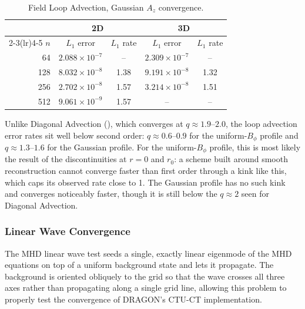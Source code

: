 \documentclass[11pt]{report}
\begin{document}
\begin{table}[htbp]
\centering
\caption{Field Loop Advection, Gaussian $A_z$ convergence.}
\begin{tabular}{rcccc}
\toprule
& \multicolumn{2}{c}{2D} & \multicolumn{2}{c}{3D} \\
\cmidrule(lr){2-3}\cmidrule(lr){4-5}
$n$ & $L_1$ error & $L_1$ rate & $L_1$ error & $L_1$ rate \\
\midrule
64  & $2.088\times10^{-7}$ & --   & $2.309\times10^{-7}$ & --   \\
128 & $8.032\times10^{-8}$ & 1.38 & $9.191\times10^{-8}$ & 1.32 \\
256 & $2.702\times10^{-8}$ & 1.57 & $3.214\times10^{-8}$ & 1.51 \\
512 & $9.061\times10^{-9}$ & 1.57 & --                   & --   \\
\bottomrule
\end{tabular}
\label{tab:loop-gaussian}
\end{table}

Unlike Diagonal Advection (), which converges at $q\approx1.9$--$2.0$, the loop advection error rates sit well below second order: $q\approx0.6$--$0.9$ for the uniform-$B_\phi$ profile and $q\approx1.3$--$1.6$ for the Gaussian profile. 
For the uniform-$B_\phi$ profile, this is most likely the result of the discontinuities at $r=0$ and $r_0$:  a scheme built around smooth reconstruction cannot converge faster than first order through a kink like this, which caps its observed rate close to 1. 
The Gaussian profile has no such kink and converges noticeably faster, though it is still below the $q\approx2$ seen for Diagonal Advection. %

\subsubsection{Linear Wave Convergence}
\label{sec:linear-waves}

The MHD linear wave test \citep{GardinerStone2008} seeds a single, exactly linear eigenmode of the MHD equations on top of a uniform background state and lets it propagate.
The background is oriented obliquely to the grid so that the wave crosses all three axes rather than propagating along a single grid line, allowing this problem to properly test the convergence of DRAGON's CTU-CT implementation.
\end{document}
